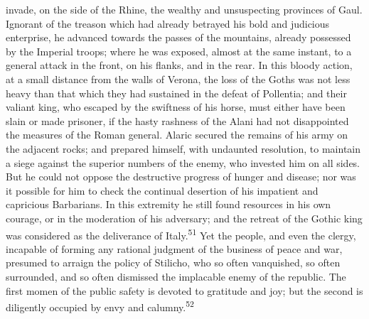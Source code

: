 invade, on the side of the Rhine, the wealthy and unsuspecting
provinces of Gaul. Ignorant of the treason which had already
betrayed his bold and judicious enterprise, he advanced towards
the passes of the mountains, already possessed by the Imperial
troops; where he was exposed, almost at the same instant, to a
general attack in the front, on his flanks, and in the rear. In
this bloody action, at a small distance from the walls of Verona,
the loss of the Goths was not less heavy than that which they had
sustained in the defeat of Pollentia; and their valiant king, who
escaped by the swiftness of his horse, must either have been
slain or made prisoner, if the hasty rashness of the Alani had
not disappointed the measures of the Roman general. Alaric
secured the remains of his army on the adjacent rocks; and
prepared himself, with undaunted resolution, to maintain a siege
against the superior numbers of the enemy, who invested him on
all sides. But he could not oppose the destructive progress of
hunger and disease; nor was it possible for him to check the
continual desertion of his impatient and capricious Barbarians.
In this extremity he still found resources in his own courage, or
in the moderation of his adversary; and the retreat of the Gothic
king was considered as the deliverance of Italy.\textsuperscript{51} Yet the
people, and even the clergy, incapable of forming any rational
judgment of the business of peace and war, presumed to arraign
the policy of Stilicho, who so often vanquished, so often
surrounded, and so often dismissed the implacable enemy of the
republic. The first momen of the public safety is devoted to
gratitude and joy; but the second is diligently occupied by envy
and calumny.\textsuperscript{52}





